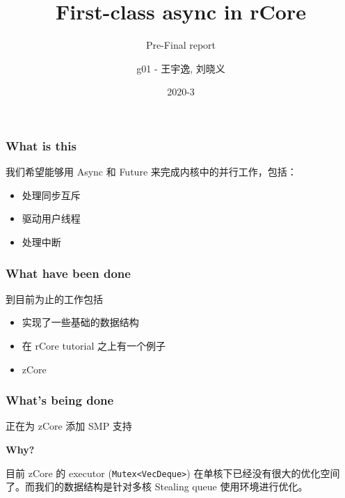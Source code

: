 \documentclass[UTF-8]{ctexbeamer}
\title{First-class async in rCore}
\subtitle{Pre-Final report}
\author{g01 - 王宇逸, 刘晓义}
\date{2020-3}
\begin{document}
\begin{frame}
  \titlepage
\end{frame}

\begin{frame}
  \frametitle{What is this}

  我们希望能够用 Async 和 Future 来完成内核中的并行工作，包括：
  \begin{itemize}
    \item 处理同步互斥
    \item 驱动用户线程
    \item 处理中断
  \end{itemize}
\end{frame}

\begin{frame}
  \frametitle{What have been done}

  到目前为止的工作包括
  \begin{itemize}
    \item 实现了一些基础的数据结构
    \item 在 rCore tutorial 之上有一个例子
    \item zCore
  \end{itemize}
\end{frame}

\begin{frame}
  \frametitle{What's being done}

   正在为 zCore 添加 SMP 支持

   \pause
   \vspace{1em}

   \textbf{Why?}

   目前 zCore 的 executor (\texttt{Mutex<VecDeque>}) 在单核下已经没有很大的优化空间了。而我们的数据结构是针对多核 Stealing queue 使用环境进行优化。
\end{frame}
\end{document}
